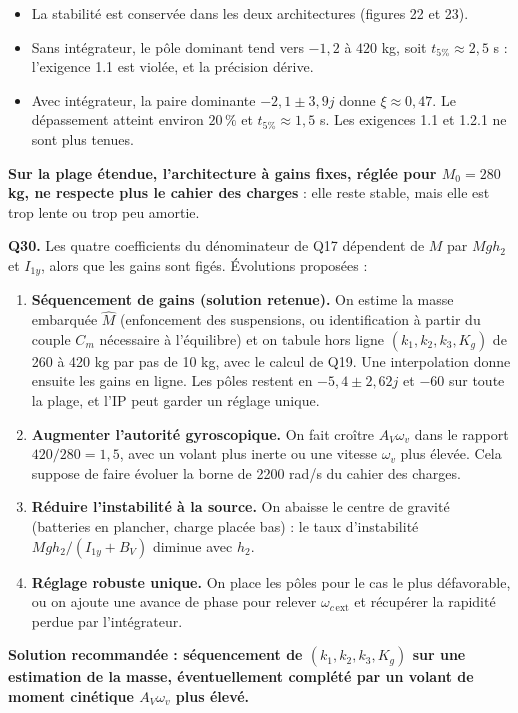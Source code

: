 \documentclass[11pt,a4paper]{article}
\providecommand{\tightlist}{\setlength{\itemsep}{0pt}\setlength{\parskip}{0pt}}
\begin{document}
\begin{itemize}
\tightlist
\item
  La stabilité est conservée dans les deux architectures (figures 22 et 23).
\item
  Sans intégrateur, le pôle dominant tend vers \(-1{,}2\) à \(420\) kg, soit \(t_{5\%}\approx2{,}5\) s : l'exigence 1.1 est violée, et la précision dérive.
\item
  Avec intégrateur, la paire dominante \(-2{,}1\pm3{,}9j\) donne \(\xi\approx0{,}47\). Le dépassement atteint environ \(20\,\%\) et \(t_{5\%}\approx1{,}5\) s. Les exigences 1.1 et 1.2.1 ne sont plus tenues.
\end{itemize}

\textbf{Sur la plage étendue, l'architecture à gains fixes, réglée pour \(M_0=280\) kg, ne respecte plus le cahier des charges} : elle reste stable, mais elle est trop lente ou trop peu amortie.

\textbf{Q30.} Les quatre coefficients du dénominateur de Q17 dépendent de \(M\) par \(Mgh_2\) et \(I_{1y}\), alors que les gains sont figés. Évolutions proposées :

\begin{enumerate}
\def\labelenumi{\arabic{enumi}.}
\tightlist
\item
  \textbf{Séquencement de gains (solution retenue).} On estime la masse embarquée \(\hat M\) (enfoncement des suspensions, ou identification à partir du couple \(C_m\) nécessaire à l'équilibre) et on tabule hors ligne \((k_1,k_2,k_3,K_g)\) de 260 à 420 kg par pas de 10 kg, avec le calcul de Q19. Une interpolation donne ensuite les gains en ligne. Les pôles restent en \(-5{,}4\pm2{,}62j\) et \(-60\) sur toute la plage, et l'IP peut garder un réglage unique.
\item
  \textbf{Augmenter l'autorité gyroscopique.} On fait croître \(A_V\omega_v\) dans le rapport \(420/280=1{,}5\), avec un volant plus inerte ou une vitesse \(\omega_v\) plus élevée. Cela suppose de faire évoluer la borne de 2200 rad/s du cahier des charges.
\item
  \textbf{Réduire l'instabilité à la source.} On abaisse le centre de gravité (batteries en plancher, charge placée bas) : le taux d'instabilité \(Mgh_2/(I_{1y}+B_V)\) diminue avec \(h_2\).
\item
  \textbf{Réglage robuste unique.} On place les pôles pour le cas le plus défavorable, ou on ajoute une avance de phase pour relever \(\omega_{c\,\text{ext}}\) et récupérer la rapidité perdue par l'intégrateur.
\end{enumerate}

\textbf{Solution recommandée : séquencement de \((k_1,k_2,k_3,K_g)\) sur une estimation de la masse, éventuellement complété par un volant de moment cinétique \(A_V\omega_v\) plus élevé.}
\end{document}
